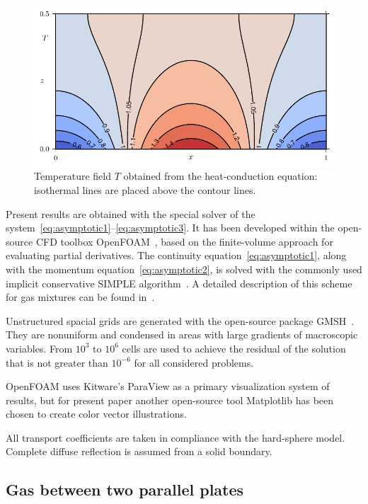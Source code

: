 \documentclass[smallextended, referee]{svjour3} %
\begin{document}
\begin{figure}[ht]
	\centering
	\includegraphics{Fig4}
	\caption{Temperature field \(T\) obtained from the heat-conduction equation:
		isothermal lines are placed above the contour lines.}
	\label{fig:moving:T_heat}
\end{figure}

Present results are obtained with the special solver of the system~\eqref{eq:asymptotic1}--\eqref{eq:asymptotic3}.
It has been developed within the open-source CFD toolbox OpenFOAM\textregistered{}~\cite{OpenFOAM1998},
based on the finite-volume approach for evaluating partial derivatives.
The continuity equation~\eqref{eq:asymptotic1}, along with the momentum equation~\eqref{eq:asymptotic2},
is solved with the commonly used implicit conservative SIMPLE algorithm~\cite{SIMPLE}.
A detailed description of this scheme for gas mixtures can be found in~\cite{Laneryd2007}.

Unstructured spacial grids are generated with the open-source package GMSH~\cite{GMSH}.
They are nonuniform and condensed in areas with large gradients of macroscopic variables.
From \(10^3\) to \(10^6\) cells are used to achieve the residual of the solution
that is not greater than \(10^{-6}\) for all considered problems.

OpenFOAM\textregistered{} uses Kitware's ParaView\textregistered{} as a primary visualization system of results,
but for present paper another open-source tool Matplotlib has been chosen to create color vector illustrations.

All transport coefficients are taken in compliance with the hard-sphere model.
Complete diffuse reflection is assumed from a solid boundary.

\subsection{Gas between two parallel plates}
\end{document}
